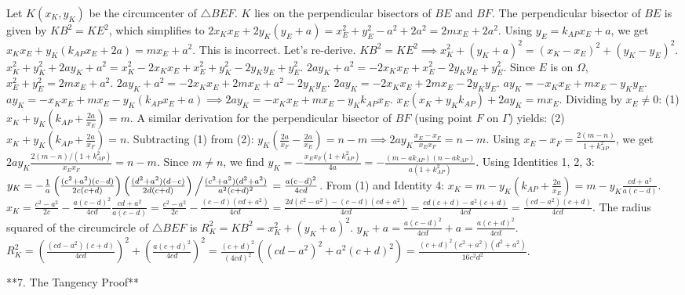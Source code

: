 \documentclass[12pt]{article}
\begin{document}
Let $K(x_K, y_K)$ be the circumcenter of $\triangle BEF$. $K$ lies on the perpendicular bisectors of $BE$ and $BF$.
The perpendicular bisector of $BE$ is given by $KB^2=KE^2$, which simplifies to $2x_Kx_E+2y_K(y_E+a) = x_E^2+y_E^2-a^2+2a^2 = 2mx_E+2a^2$. Using $y_E=k_{AP}x_E+a$, we get $x_Kx_E+y_K(k_{AP}x_E+2a) = mx_E+a^2$. This is incorrect.
Let's re-derive. $KB^2=KE^2 \implies x_K^2+(y_K+a)^2 = (x_K-x_E)^2+(y_K-y_E)^2$.
$x_K^2+y_K^2+2ay_K+a^2 = x_K^2-2x_Kx_E+x_E^2+y_K^2-2y_Ky_E+y_E^2$.
$2ay_K+a^2 = -2x_Kx_E+x_E^2-2y_Ky_E+y_E^2$.
Since $E$ is on $\Omega$, $x_E^2+y_E^2=2mx_E+a^2$.
$2ay_K+a^2 = -2x_Kx_E+2mx_E+a^2-2y_Ky_E$.
$2ay_K = -2x_Kx_E+2mx_E-2y_Ky_E$.
$ay_K = -x_Kx_E+mx_E-y_Ky_E$.
$ay_K = -x_Kx_E+mx_E-y_K(k_{AP}x_E+a) \implies 2ay_K = -x_Kx_E+mx_E-y_Kk_{AP}x_E$.
$x_E(x_K+y_Kk_{AP}) + 2ay_K = mx_E$. Dividing by $x_E \neq 0$:
(1) $x_K + y_K(k_{AP}+\frac{2a}{x_E}) = m$.
A similar derivation for the perpendicular bisector of $BF$ (using point $F$ on $\Gamma$) yields:
(2) $x_K + y_K(k_{AP}+\frac{2a}{x_F}) = n$.
Subtracting (1) from (2): $y_K(\frac{2a}{x_F}-\frac{2a}{x_E}) = n-m \implies 2ay_K\frac{x_E-x_F}{x_Ex_F} = n-m$.
Using $x_E-x_F = \frac{2(m-n)}{1+k_{AP}^2}$, we get $2ay_K \frac{2(m-n)/(1+k_{AP}^2)}{x_Ex_F} = n-m$. Since $m \neq n$, we find $y_K = -\frac{x_Ex_F(1+k_{AP}^2)}{4a} = -\frac{(m-ak_{AP})(n-ak_{AP})}{a(1+k_{AP}^2)}$.
Using Identities 1, 2, 3:
$y_K = -\frac{1}{a} \left(\frac{(c^2+a^2)(c-d)}{2c(c+d)}\right) \left(\frac{(d^2+a^2)(d-c)}{2d(c+d)}\right) \left/ \frac{(c^2+a^2)(d^2+a^2)}{a^2(c+d)^2} \right. = \frac{a(c-d)^2}{4cd}$.
From (1) and Identity 4: $x_K = m - y_K(k_{AP}+\frac{2a}{x_E}) = m - y_K\frac{cd+a^2}{a(c-d)}$.
$x_K = \frac{c^2-a^2}{2c} - \frac{a(c-d)^2}{4cd} \frac{cd+a^2}{a(c-d)} = \frac{c^2-a^2}{2c} - \frac{(c-d)(cd+a^2)}{4cd} = \frac{2d(c^2-a^2) - (c-d)(cd+a^2)}{4cd} = \frac{cd(c+d)-a^2(c+d)}{4cd} = \frac{(cd-a^2)(c+d)}{4cd}$.
The radius squared of the circumcircle of $\triangle BEF$ is $R_K^2 = KB^2 = x_K^2+(y_K+a)^2$.
$y_K+a = \frac{a(c-d)^2}{4cd}+a = \frac{a(c+d)^2}{4cd}$.
$R_K^2 = \left(\frac{(cd-a^2)(c+d)}{4cd}\right)^2 + \left(\frac{a(c+d)^2}{4cd}\right)^2 = \frac{(c+d)^2}{(4cd)^2} \left((cd-a^2)^2 + a^2(c+d)^2\right) = \frac{(c+d)^2(c^2+a^2)(d^2+a^2)}{16c^2d^2}$.

**7. The Tangency Proof**
\end{document}
